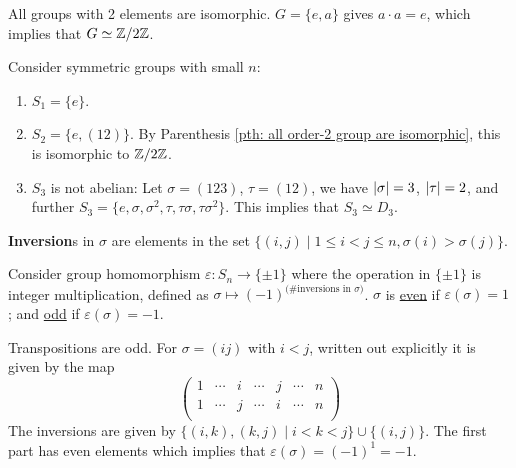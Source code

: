 \begin{parenthesis} \label{pth: all order-2 group are isomorphic}
    All groups with 2 elements are isomorphic. $G = \{e, a\}$ gives $a \cdot a = e$, which implies that $G \simeq \mathbb{Z}/2\mathbb{Z}$.
\end{parenthesis}

\begin{example}
    Consider symmetric groups with small $n$: 
    \begin{enumerate}
        \item $S_1 = \{e\}$. 
        \item $S_2 = \{e, (1 2)\}$. By Parenthesis \ref{pth: all order-2 group are isomorphic}, this is isomorphic to $\mathbb{Z}/2\mathbb{Z}$.
        \item $S_3$ is not abelian: Let $\sigma = (1 2 3)$, $\tau = (1 2)$, we have $\left|\sigma\right| = 3$, $\left|\tau\right| = 2$, and further $S_3 = \{e, \sigma, \sigma^2, \tau, \tau\sigma, \tau\sigma^2\}$. This implies that $S_3 \simeq D_3$.
    \end{enumerate}
\end{example}

\begin{definition}[Inversion]
    \textbf{Inversion}s in $\sigma$ are elements in the set $\{ (i, j) \mid 1 \leq i < j \leq n , \sigma(i) > \sigma(j)\}$.
\end{definition}

\begin{definition}[Signature]
    Consider group homomorphism $\varepsilon: S_n \to \{ \pm 1 \}$ where the operation in $\{ \pm 1 \}$ is integer multiplication, defined as $\sigma \mapsto (-1)^{\text{(\# inversions in $\sigma$)}}$. $\sigma$ is \underline{even} if $\varepsilon(\sigma) = 1$; and \underline{odd} if $\varepsilon(\sigma) = -1$. 
\end{definition}

\begin{example}
    Transpositions are odd. For $\sigma = (i j)$ with $i < j$, written out explicitly it is given by the map
    \[
        \begin{pmatrix}
            1 & \cdots & i & \cdots & j & \cdots & n \\
            1 & \cdots & j & \cdots & i & \cdots & n \\
        \end{pmatrix}
    \]
    The inversions are given by $\{ (i, k), (k, j) \mid i < k < j \} \cup \{ (i, j) \}$. The first part has even elements which implies that $\varepsilon(\sigma) = (-1)^1 = -1$. 
\end{example}

